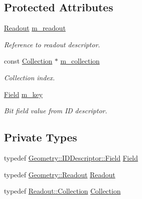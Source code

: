 \subsection*{Protected Attributes}
\begin{DoxyCompactItemize}
\item 
\hyperlink{class_d_d4hep_1_1_simulation_1_1_geant4_readout_volume_filter_a30e6a3445a33de61e3c648149e285c46}{Readout} \hyperlink{class_d_d4hep_1_1_simulation_1_1_geant4_readout_volume_filter_a37eef102fa9c5ac1618be624129b61de}{m\+\_\+readout}
\begin{DoxyCompactList}\small\item\em Reference to readout descriptor. \end{DoxyCompactList}\item 
const \hyperlink{class_d_d4hep_1_1_simulation_1_1_geant4_readout_volume_filter_a8a5e97e2736eb07d0d98f3300ca4b61d}{Collection} $\ast$ \hyperlink{class_d_d4hep_1_1_simulation_1_1_geant4_readout_volume_filter_ab38d8bb4c3c84b5e71af194dc2e9c060}{m\+\_\+collection}
\begin{DoxyCompactList}\small\item\em Collection index. \end{DoxyCompactList}\item 
\hyperlink{class_d_d4hep_1_1_simulation_1_1_geant4_readout_volume_filter_a6b5e464fd34617d118c15b917c9094fa}{Field} \hyperlink{class_d_d4hep_1_1_simulation_1_1_geant4_readout_volume_filter_a56f36107494374152415b45a635d4030}{m\+\_\+key}
\begin{DoxyCompactList}\small\item\em Bit field value from ID descriptor. \end{DoxyCompactList}\end{DoxyCompactItemize}
\subsection*{Private Types}
\begin{DoxyCompactItemize}
\item 
typedef \hyperlink{class_d_d4hep_1_1_geometry_1_1_i_d_descriptor_ac06f5915e74f8a8f2ff73e9a322556e4}{Geometry\+::\+I\+D\+Descriptor\+::\+Field} \hyperlink{class_d_d4hep_1_1_simulation_1_1_geant4_readout_volume_filter_a6b5e464fd34617d118c15b917c9094fa}{Field}
\item 
typedef \hyperlink{class_d_d4hep_1_1_geometry_1_1_readout}{Geometry\+::\+Readout} \hyperlink{class_d_d4hep_1_1_simulation_1_1_geant4_readout_volume_filter_a30e6a3445a33de61e3c648149e285c46}{Readout}
\item 
typedef \hyperlink{class_d_d4hep_1_1_geometry_1_1_readout_ac1c39a13ec9bd42d658319fa48cac81d}{Readout\+::\+Collection} \hyperlink{class_d_d4hep_1_1_simulation_1_1_geant4_readout_volume_filter_a8a5e97e2736eb07d0d98f3300ca4b61d}{Collection}
\end{DoxyCompactItemize}
